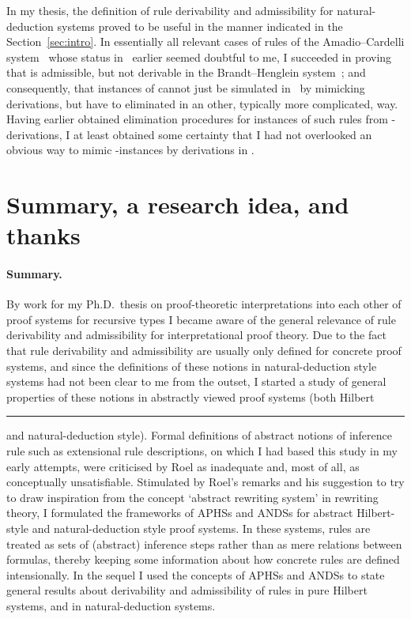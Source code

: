\documentclass[envcountsame,runningheads]{llncs}
\newcommand{\APHS}{A\hspace*{-0.3pt}P\hspace*{-0.6pt}H\hspace*{-0.4pt}S}
\newcommand{\ANDS}{ANDS}
\begin{document}
In my thesis, the definition of rule derivability and admissibility
for natural-deduction systems proved to be useful in the manner
indicated in the Section~\ref{sec:intro}.
In essentially all relevant cases of rules  of the
Amadio--Cardelli system \ACeq\ whose status
in \BHeq\ earlier seemed doubtful to me,
I succeeded in proving that  is admissible, but not derivable
in the Brandt--Henglein system~\BHeq; and consequently, that
instances of  cannot just be simulated in \BHeq\ 
by mimicking derivations, but have to eliminated in an other,
typically more complicated, way.
Having earlier obtained  elimination procedures for instances
of such rules  from \BHeq-derivations,
I at least obtained some certainty that I had not overlooked an
obvious way to mimic -instances by derivations in \BHeq. 



\section{Summary, a research idea, and thanks}
  \label{sec:conclusion}


\paragraph{Summary.}
By work for my Ph.D.~thesis on proof-theoretic interpretations into each other 
of proof systems for recursive types I became aware of the general relevance
of rule derivability and admissibility for interpretational proof theory. 
Due to the fact that rule derivability and admissibility are usually only
defined for concrete proof systems, and since the definitions of these
notions in natural-deduction style systems had not been clear to me
from the outset, I started a study of general properties of these notions
in abstractly viewed proof systems (both Hilbert\rule{1pt}{0pt} 
and natural-deduction style).
Formal definitions of abstract notions of inference rule
such as extensional rule descriptions, on which I had based
this study in my early attempts, 
were criticised by Roel as inadequate and, most of all, as conceptually 
unsatisfiable. 
Stimulated by Roel's remarks and his suggestion to try to draw inspiration from
the concept `abstract rewriting system' in rewriting theory,
I formulated the frameworks of \APHS{s} and \ANDS{s} for
abstract Hilbert-style and natural-deduction style proof systems.
In these systems, rules  
are treated as sets of (abstract) inference steps rather than
as mere relations between formulas, thereby keeping 
some information about how concrete rules are defined intensionally. 
In the sequel I used the concepts of \APHS{s} and \ANDS{s} to
state general results about derivability and admissibility of rules 
in pure Hilbert systems, and in natural-deduction systems.
\end{document}

